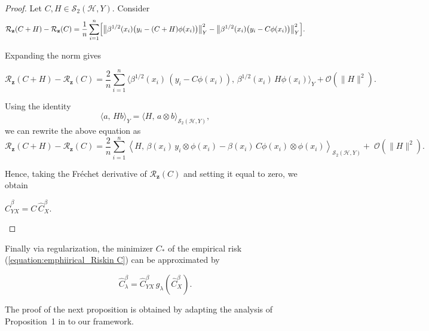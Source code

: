\documentclass[twoside,11pt]{article}
\begin{document}
\noindent
\begin{proof}
Let $C,H \in \mathcal S_2(\mathcal{H},Y)$.
Consider
\[
\mathcal{R}_{\mathbf z}(C+H) - \mathcal{R}_{\mathbf z}(C)
=
\frac{1}{n}\sum_{i=1}^n
\Bigl[
\bigl\| \beta^{1/2}(x_i)\bigl(y_i - (C+H)\phi(x_i)\bigr) \bigr\|_{Y}^2
-
\bigl\| \beta^{1/2}(x_i)\bigl(y_i - C\phi(x_i)\bigr) \bigr\|_{Y}^2
\Bigr].
\]




\noindent
Expanding the norm gives

\vspace{0.5em}
\noindent
\[
\mathcal{R}_\mathbf{z}(C+H) - \mathcal{R}_\mathbf{z}(C)
    = \frac{2}{n}\sum_{i=1}^n 
        \Big\langle \beta^{1/2}(x_i)\,(y_i - C \phi(x_i)),\,
        \beta^{1/2}(x_i)\, H \phi(x_i) \Big\rangle_{Y}
        + \mathcal{O}(\|H\|^2).
\]
\vspace{0.5em}

\noindent
Using the identity
\[
    \langle a,\, H b \rangle_{Y} 
    = \langle H,\, a \otimes b \rangle_{\mathcal S_2(\mathcal{H},Y)},
\]
we can rewrite the above equation as
\[
\mathcal{R}_{\mathbf z}(C+H) - \mathcal{R}_{\mathbf z}(C)
=
\frac{2}{n}\sum_{i=1}^n
\left\langle
H,\,
\beta(x_i)\, y_i \otimes \phi(x_i)
-
\beta(x_i)\, C\phi(x_i) \otimes \phi(x_i)
\right\rangle_{\mathcal{S}_2(\mathcal{H},Y)}
+\;
\mathcal O(\|H\|^2).
\]


\noindent
Hence, taking the Fréchet derivative of $\mathcal{R}_\mathbf{z}(C)$ and setting it equal to zero, we obtain
\begin{center}
    $\widehat{C}_{YX}^\beta = C \, \widehat{C}_{X}^\beta.$
\end{center}
\end{proof}
\noindent
Finally via regularization, the minimizer $C_*$ of the empirical risk (\ref{equation:emphiirical_Riskin C}) can be approximated by 

\begin{equation}\label{c-equation}
\widehat{C}_\lambda ^\beta
= \widehat{C}_{YX}^\beta \, g_\lambda \!\left(\widehat{C}_{X}^\beta\right).
\end{equation}



\noindent
The proof of the next proposition is obtained by adapting the analysis of Proposition~1 in \cite{meunier2024optimal} to our framework.
\end{document}
